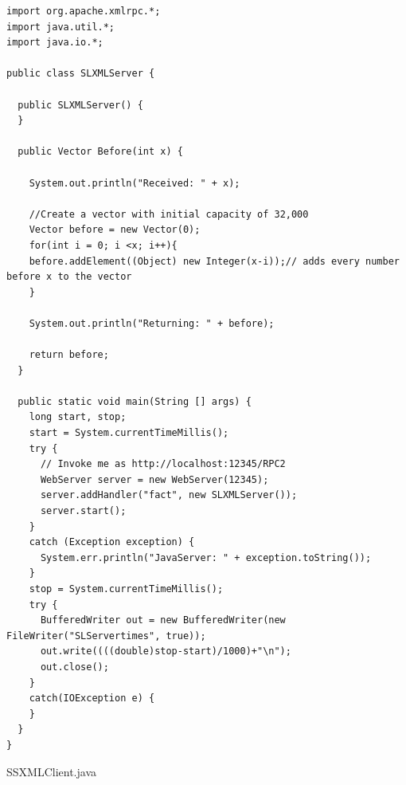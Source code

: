\documentclass{article}
\begin{document}
\begin{lstlisting}
import org.apache.xmlrpc.*;
import java.util.*;
import java.io.*;

public class SLXMLServer {

  public SLXMLServer() {
  }

  public Vector Before(int x) {

    System.out.println("Received: " + x);

    //Create a vector with initial capacity of 32,000
    Vector before = new Vector(0);
    for(int i = 0; i <x; i++){
    before.addElement((Object) new Integer(x-i));// adds every number before x to the vector
    }

    System.out.println("Returning: " + before);

    return before;
  }

  public static void main(String [] args) {
    long start, stop;
    start = System.currentTimeMillis();
    try {
      // Invoke me as http://localhost:12345/RPC2
      WebServer server = new WebServer(12345);
      server.addHandler("fact", new SLXMLServer());
      server.start();
    }
    catch (Exception exception) {
      System.err.println("JavaServer: " + exception.toString());
    }
    stop = System.currentTimeMillis();
    try {
      BufferedWriter out = new BufferedWriter(new FileWriter("SLServertimes", true));
      out.write((((double)stop-start)/1000)+"\n");
      out.close();
    }
    catch(IOException e) {
    }
  }
}
\end{lstlisting}

SSXMLClient.java
\end{document}
